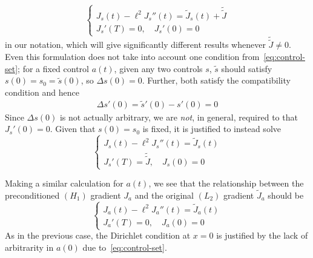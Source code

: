 \documentclass[letterpaper, 10pt, draft]{amsart}
\theoremstyle{definition}
\theoremstyle{remark}
\begin{document}
\begin{equation*}
  \begin{cases}
    J_s(t) - \ell^2 J_s''(t) = \tilde{J}_s(t) + \tilde{\tilde{J}}
    \\
    J_s'(T) = 0,\quad
    J_s'(0) = 0
  \end{cases}
\end{equation*}
in our notation, which will give significantly different results whenever
$\tilde{\tilde{J}}\neq 0$.
Even this formulation does not take into account one condition
from~\eqref{eq:control-set}; for a fixed control $a(t)$, given any two controls
$s$, $\tilde{s}$ should satisfy $s(0)=s_0=\tilde{s}(0)$, so ${\Delta s}(0) = 0$.
Further, both satisfy the compatibility condition and hence
\begin{gather*}
  {\Delta s}'(0) = \tilde{s}'(0) - s'(0) = 0
\end{gather*}
Since ${\Delta s}(0)$ is not actually arbitrary, we are \emph{not}, in general,
required to that $J_s'(0)=0$.
Given that $s(0)=s_0$ is fixed, it is justified to instead solve
\begin{equation}
  \begin{cases}
  J_s(t) - \ell^2 J_s''(t) = \tilde{J}_s(t)
  \\
  J_s'(T) = \tilde{\tilde{J}},\quad
  J_s(0) = 0
\end{cases}\label{eq:gradient-s-precond}
\end{equation}

Making a similar calculation for $a(t)$, we see that the relationship between
the preconditioned $(H_1)$ gradient $J_a$ and the original $(L_2)$ gradient
$\tilde{J}_a$ should be
\begin{equation}
  \begin{cases}
  J_a(t) - \ell^2 J_a''(t) = \tilde{J}_a(t)\nonumber
  \\
  J_a'(T) = 0,\quad
  J_a(0) = 0
  \end{cases}\label{eq:gradient-a-precond}
\end{equation}
As in the previous case, the Dirichlet condition at $x=0$ is justified by the
lack of arbitrarity in $a(0)$ due to~\eqref{eq:control-set}.
\end{document}
